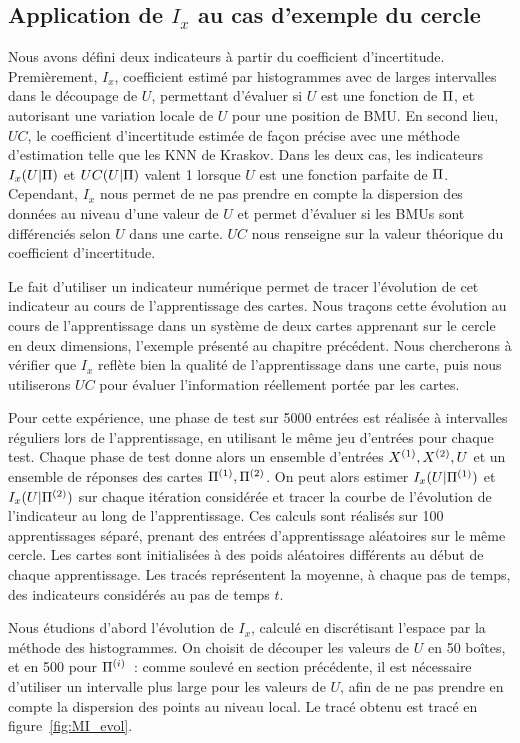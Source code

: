 \documentclass[../main]{subfiles}
\begin{document}
\subsection{Application de  $I_x$ au cas d'exemple du cercle}

Nous avons défini deux indicateurs à partir du coefficient d'incertitude. Premièrement, $I_x$, coefficient estimé par histogrammes avec de larges intervalles dans le découpage de $U$, permettant d'évaluer si $U$ est une fonction de $\Pi$, et autorisant une variation locale de $U$ pour une position de BMU.
En second lieu, $UC$, le coefficient d'incertitude estimée de façon précise avec une méthode d'estimation telle que les KNN de Kraskov.
Dans les deux cas, les indicateurs $I_x(U|\Pi)$ et $UC(U|\Pi)$ valent 1 lorsque $U$ est une fonction parfaite de $\Pi$. Cependant, $I_x$ nous permet de ne pas prendre en compte la dispersion des données au niveau d'une valeur de $U$ et permet d'évaluer si les BMUs sont différenciés selon $U$ dans une carte. 
$UC$ nous renseigne sur la valeur théorique du coefficient d'incertitude.

Le fait d'utiliser un indicateur numérique permet de tracer l'évolution de cet indicateur au cours de l'apprentissage des cartes.
Nous traçons cette évolution au cours de l'apprentissage dans un système de deux cartes apprenant sur le cercle en deux dimensions, l'exemple présenté au chapitre précédent.
Nous chercherons à vérifier que $I_x$ reflète bien la qualité de l'apprentissage dans une carte, puis nous utiliserons $UC$ pour évaluer l'information réellement portée par les cartes.

Pour cette expérience, une phase de test sur 5000 entrées est réalisée à intervalles réguliers lors de l'apprentissage, en utilisant le même jeu d'entrées pour chaque test. Chaque phase de test donne alors un ensemble d'entrées $X^{({1})}, X^{({2})}, U$ et un ensemble de réponses des cartes $\Pi^{({1})}, \Pi^{({2})}$. On peut alors estimer $I_x(U|\Pi^{({1})})$ et $I_x(U|\Pi^{({2})})$ sur chaque itération considérée et tracer la courbe de l'évolution de l'indicateur au long de l'apprentissage. 
Ces calculs sont réalisés sur 100 apprentissages séparé, prenant des entrées d'apprentissage aléatoires sur le même cercle. Les cartes sont initialisées à des poids aléatoires différents au début de chaque apprentissage. 
Les tracés représentent la moyenne, à chaque pas de temps, des indicateurs considérés au pas de temps $t$.

Nous étudions d'abord l'évolution de $I_x$, calculé en discrétisant l'espace par la méthode des histogrammes.
On choisit de découper les valeurs de $U$ en 50 boîtes, et en 500 pour $\Pi^{({i})}$~: comme soulevé en section précédente, il est nécessaire d'utiliser un intervalle plus large pour les valeurs de $U$, afin de ne pas prendre en compte la dispersion des points au niveau local. Le tracé obtenu est tracé en figure~\ref{fig:MI_evol}.
\end{document}

